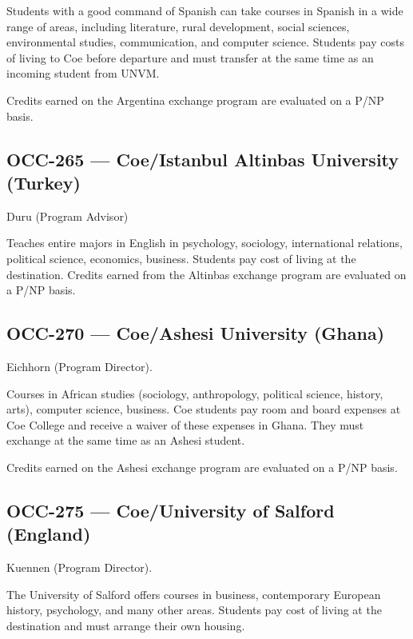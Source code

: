 \documentclass[
  letterpaper,
]{scrbook}
\begin{document}
Students with a good command of Spanish can take courses in Spanish in a
wide range of areas, including literature, rural development, social
sciences, environmental studies, communication, and computer science.
Students pay costs of living to Coe before departure and must transfer
at the same time as an incoming student from UNVM.

Credits earned on the Argentina exchange program are evaluated on a P/NP
basis.

\hypertarget{occ-265-coeistanbul-altinbas-university-turkey}{%
\subsection{OCC-265 --- Coe/Istanbul Altinbas University
(Turkey)}\label{occ-265-coeistanbul-altinbas-university-turkey}}

Duru (Program Advisor)

Teaches entire majors in English in psychology, sociology, international
relations, political science, economics, business. Students pay cost of
living at the destination. Credits earned from the Altinbas exchange
program are evaluated on a P/NP basis.

\hypertarget{occ-270-coeashesi-university-ghana}{%
\subsection{OCC-270 --- Coe/Ashesi University
(Ghana)}\label{occ-270-coeashesi-university-ghana}}

Eichhorn (Program Director).

Courses in African studies (sociology, anthropology, political science,
history, arts), computer science, business. Coe students pay room and
board expenses at Coe College and receive a waiver of these expenses in
Ghana. They must exchange at the same time as an Ashesi student.

Credits earned on the Ashesi exchange program are evaluated on a P/NP
basis.

\hypertarget{occ-275-coeuniversity-of-salford-england}{%
\subsection{OCC-275 --- Coe/University of Salford
(England)}\label{occ-275-coeuniversity-of-salford-england}}

Kuennen (Program Director).

The University of Salford offers courses in business, contemporary
European history, psychology, and many other areas. Students pay cost of
living at the destination and must arrange their own housing.
\end{document}
